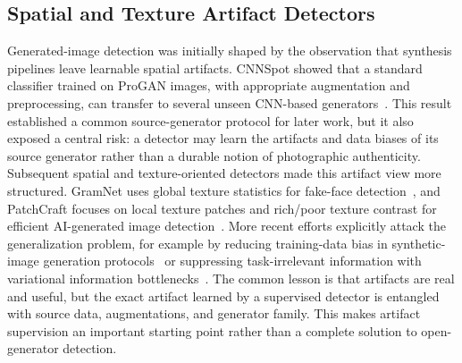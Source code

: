 \documentclass[lettersize,journal]{IEEEtran}
\begin{document}
\subsection{Spatial and Texture Artifact Detectors}
Generated-image detection was initially shaped by the observation that synthesis pipelines leave learnable spatial artifacts. CNNSpot showed that a standard classifier trained on ProGAN images, with appropriate augmentation and preprocessing, can transfer to several unseen CNN-based generators~\cite{wang2020cnnspot}. This result established a common source-generator protocol for later work, but it also exposed a central risk: a detector may learn the artifacts and data biases of its source generator rather than a durable notion of photographic authenticity. Subsequent spatial and texture-oriented detectors made this artifact view more structured. GramNet uses global texture statistics for fake-face detection~\cite{liu2020gramnet}, and PatchCraft focuses on local texture patches and rich/poor texture contrast for efficient AI-generated image detection~\cite{zhong2023patchcraft}. More recent efforts explicitly attack the generalization problem, for example by reducing training-data bias in synthetic-image generation protocols~\cite{guillaro2025biasfree} or suppressing task-irrelevant information with variational information bottlenecks~\cite{zhang2025vibnet}. The common lesson is that artifacts are real and useful, but the exact artifact learned by a supervised detector is entangled with source data, augmentations, and generator family. This makes artifact supervision an important starting point rather than a complete solution to open-generator detection.
\end{document}
